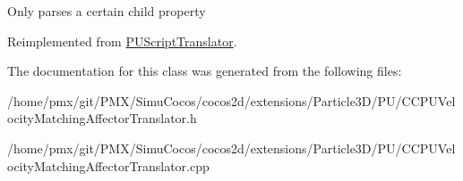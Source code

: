 Only parses a certain child property 

Reimplemented from \hyperlink{classPUScriptTranslator_a0374d83a8a04e57918975d525e0f8fe8}{P\+U\+Script\+Translator}.



The documentation for this class was generated from the following files\+:\begin{DoxyCompactItemize}
\item 
/home/pmx/git/\+P\+M\+X/\+Simu\+Cocos/cocos2d/extensions/\+Particle3\+D/\+P\+U/C\+C\+P\+U\+Velocity\+Matching\+Affector\+Translator.\+h\item 
/home/pmx/git/\+P\+M\+X/\+Simu\+Cocos/cocos2d/extensions/\+Particle3\+D/\+P\+U/C\+C\+P\+U\+Velocity\+Matching\+Affector\+Translator.\+cpp\end{DoxyCompactItemize}
